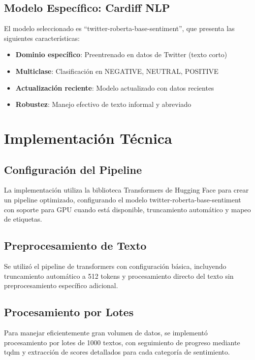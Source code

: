 \documentclass[12pt,a4paper,twoside,openany]{book}
\begin{document}
\subsection{Modelo Específico: Cardiff NLP}

El modelo seleccionado es ``twitter-roberta-base-sentiment'', que presenta las siguientes características:

\begin{itemize}
    \item \textbf{Dominio específico}: Preentrenado en datos de Twitter (texto corto)
    \item \textbf{Multiclase}: Clasificación en NEGATIVE, NEUTRAL, POSITIVE
    \item \textbf{Actualización reciente}: Modelo actualizado con datos recientes
    \item \textbf{Robustez}: Manejo efectivo de texto informal y abreviado
\end{itemize}

\section{Implementación Técnica}

\subsection{Configuración del Pipeline}

La implementación utiliza la biblioteca Transformers de Hugging Face para crear un pipeline optimizado, configurando el modelo twitter-roberta-base-sentiment con soporte para GPU cuando está disponible, truncamiento automático y mapeo de etiquetas.

\subsection{Preprocesamiento de Texto}

Se utilizó el pipeline de transformers con configuración básica, incluyendo truncamiento automático a 512 tokens y procesamiento directo del texto sin preprocesamiento específico adicional.

\subsection{Procesamiento por Lotes}

Para manejar eficientemente gran volumen de datos, se implementó procesamiento por lotes de 1000 textos, con seguimiento de progreso mediante tqdm y extracción de scores detallados para cada categoría de sentimiento.
\end{document}
